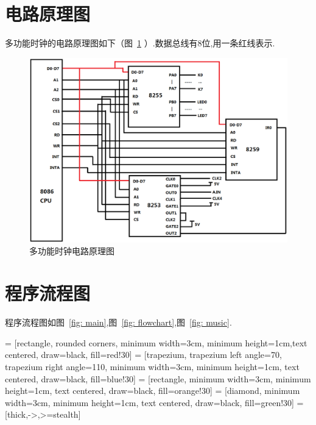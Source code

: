 \documentclass[11pt]{article}
\begin{document}
\section{电路原理图}
多功能时钟的电路原理图如下（图~\ref{fig: circuit} ）.数据总线有8位,用一条红线表示.
\begin{center}
\begin{figure}
\includegraphics[width=\textwidth]{circuit.eps}
\caption{多功能时钟电路原理图}
\label{fig: circuit}
\end{figure}
\end{center}

\section{程序流程图}

程序流程图如图~\ref{fig: main},图~\ref{fig: flowchart},图~\ref{fig: music}.

 = [rectangle, rounded corners, minimum width=3cm, minimum height=1cm,text centered, draw=black, fill=red!30]
 = [trapezium, trapezium left angle=70, trapezium right angle=110, minimum width=3cm, minimum height=1cm, text centered, draw=black, fill=blue!30]
 = [rectangle, minimum width=3cm, minimum height=1cm, text centered, draw=black, fill=orange!30]
 = [diamond, minimum width=3cm, minimum height=1cm, text centered, draw=black, fill=green!30]
 = [thick,->,>=stealth]
\end{document}
